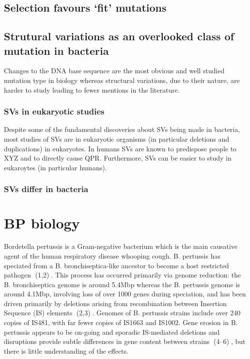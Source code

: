 \documentclass{article}
\begin{document}
\subsection{Selection favours `fit' mutations}

\subsection{Strutural variations as an overlooked class of mutation in bacteria}

Changes to the DNA base sequence are the most obvious and well studied mutation type in biology whereas structural variations, due to their nature, are harder to study leading to fewer mentions in the literature. 



\subsubsection{SVs in eukaryotic studies}
Despite some of the fundamental discoveries about SVs being made in bacteria, most studies of SVs are in eukaryotic organisms (in particular deletions and duplications) in eukaryotes. In humans SVs are known to predispose people to XYZ and to directly cause QPR. Furthermore, SVs can be easier to study in eukaroytes (in particular humans).


\subsubsection{SVs differ in bacteria}


\subsection{}


\section{BP biology}
Bordetella pertussis is a Gram-negative bacterium which is the main causative agent of the human respiratory disease whooping cough. B. pertussis has speciated from a B. bronchiseptica-like ancestor to become a host restricted pathogen (1,2). This process has occurred primarily via genome reduction: the B. bronchiseptica genome is around 5.4Mbp whereas the B. pertussis genome is around 4.1Mbp, involving loss of over 1000 genes during speciation, and has been driven primarily by deletions arising from recombination between Insertion Sequence (IS) elements (2,3). Genomes of B. pertussis strains include over 240 copies of IS481, with far fewer copies of IS1663 and IS1002. Gene erosion in B. pertussis appears to be on-going and sporadic IS-mediated deletions and disruptions provide subtle differences in gene content between strains (4–6), but there is little understanding of the effects. 
\end{document}
